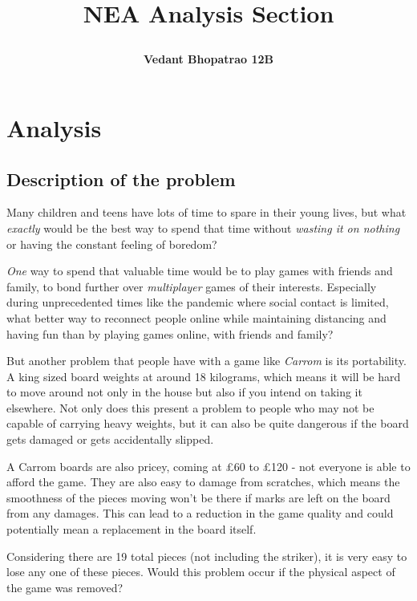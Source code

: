 \documentclass[11pt,a4paper]{report}
\title{ \begin{Huge} \textbf{NEA Analysis Section} \end{Huge} }
\author{ \begin{LARGE} \textbf{Vedant Bhopatrao 12B}
\end{LARGE} }
\date{ \begin{large} \textbf{Monday 3rd May 2021}
\end{large} }
\begin{document}
    \maketitle
    \tableofcontents

\newpage
\chapter{Analysis}
\section{Description of the problem}
Many children and teens have lots of time to spare in their young lives, but what \textit{exactly} would be the best way to spend that time without \textit{wasting it on nothing} or having the constant feeling of boredom? \newline

\noindent \textit{One} way to spend that valuable time would be to play games with friends and family, to bond further over \textit{multiplayer} games of their interests. Especially during unprecedented times like the pandemic where social contact is limited, what better way to reconnect people online while maintaining distancing and having fun than by playing games online, with friends and family? \newline

\noindent But another problem that people have with a game like \textit{Carrom} is its portability. A king sized board weights at around 18 kilograms, which means it will be hard to move around not only in the house but also if you intend on taking it elsewhere. Not only does this present a problem to people who may not be capable of carrying heavy weights, but it can also be quite dangerous if the board gets damaged or gets accidentally slipped.  \newline

\noindent A Carrom boards are also pricey, coming at £60 to £120 - not everyone is able to afford the game. They are also easy to damage from scratches, which means the smoothness of the pieces moving won't be there if marks are left on the board from any damages. This can lead to a reduction in the game quality and could potentially mean a replacement in the board itself. \newline

\noindent Considering there are 19 total pieces (not including the striker), it is very easy to lose any one of these pieces. Would this problem occur if the physical aspect of the game was removed? \newline
\end{document}
